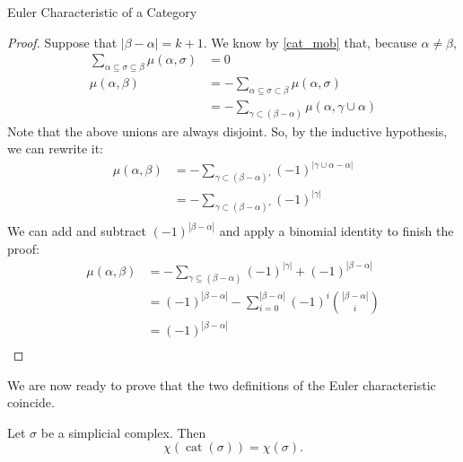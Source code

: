 \documentclass[12pt]{pom_thesis}
\DeclareMathOperator{\cat}{cat}
\begin{document}
\begin{chapter}{Euler Characteristic of a Category}
\begin{proof}
Suppose that $|\beta - \alpha| = k+1$. We know by \ref{cat_mob} that, because $\alpha \neq \beta$,
 \begin{align*}
\sum_{\alpha \subseteq \sigma \subseteq \beta} \mu(\alpha, \sigma)&= 0\\
\mu(\alpha, \beta) &=  - \sum_{\alpha \subseteq \sigma \subset \beta} \mu(\alpha, \sigma)\\
&= - \sum_{\gamma \subset (\beta - \alpha)} \mu(\alpha, \gamma \cup \alpha) 
\end{align*}
Note that the above unions are always disjoint. So, by the inductive hypothesis, we can rewrite it:
\begin{align*}
\mu(\alpha, \beta) &= - \sum_{\gamma \subset (\beta - \alpha)'} (-1)^{|\gamma \cup \alpha - \alpha|} \\ %
&= - \sum_{\gamma \subset (\beta - \alpha)'} (-1)^{|\gamma|}\\ %
\end{align*}
We can add and subtract $(-1)^{|\beta - \alpha|}$ and apply a binomial identity to finish the proof:
\begin{align*}
\mu(\alpha, \beta) &= - \sum_{\gamma \subseteq (\beta - \alpha)} (-1)^{|\gamma|} + (-1)^{|\beta - \alpha|} \\ 
&= (-1)^{|\beta - \alpha|} -  \sum_{i = 0}^{|\beta - \alpha|}(-1)^i{|\beta- \alpha| \choose i}\\ 
&= (-1)^{|\beta - \alpha|} \\ 
\end{align*}
\end{proof}
We are now ready to prove that the two definitions of the Euler characteristic coincide.
\begin{thm}
\label{consistentEuler}
Let $\sigma$ be a simplicial complex. Then 
\[
\chi(\cat(\sigma)) = \chi(\sigma).
\]


\end{thm}
\end{chapter}
\end{document}
